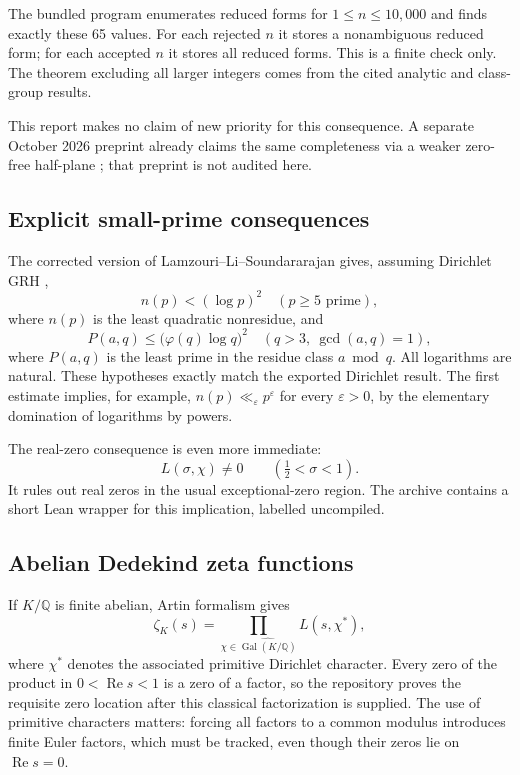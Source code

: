 \documentclass[11pt,letterpaper]{article}
\theoremstyle{definition}
\theoremstyle{remark}
\newcommand{\Q}{\mathbb Q}
\newcommand{\eps}{\varepsilon}
\newcommand{\Rea}{\operatorname{Re}}
\newcommand{\Gal}{\operatorname{Gal}}
\begin{document}
The bundled program enumerates reduced forms for \(1\le n\le10{,}000\)
and finds exactly these 65 values. For each rejected \(n\) it stores a
nonambiguous reduced form; for each accepted \(n\) it stores all reduced
forms. This is a finite check only. The theorem excluding all larger
integers comes from the cited analytic and class-group results.

This report makes no claim of new priority for this consequence. A
separate October 2026 preprint already claims the same completeness via
a weaker zero-free half-plane \cite{openai-quasi}; that preprint is not
audited here.

\subsection{Explicit small-prime consequences}

The corrected version of Lamzouri--Li--Soundararajan gives, assuming
Dirichlet GRH \cite[Corollaries 1.1 and 1.2]{lls},
\[
 n(p)<(\log p)^2\quad(p\ge5\text{ prime}),
\]
where \(n(p)\) is the least quadratic nonresidue, and
\[
 P(a,q)\le\bigl(\varphi(q)\log q\bigr)^2
 \quad(q>3,\ \gcd(a,q)=1),
\]
where \(P(a,q)\) is the least prime in the residue class \(a\bmod q\).
All logarithms are natural. These hypotheses exactly match the exported
Dirichlet result. The first estimate implies, for example,
\(n(p)\ll_\eps p^\eps\) for every \(\eps>0\), by the elementary domination
of logarithms by powers.

The real-zero consequence is even more immediate:
\[
 L(\sigma,\chi)\ne0\qquad(\tfrac12<\sigma<1).
\]
It rules out real zeros in the usual exceptional-zero region.
The archive contains a short Lean wrapper for this implication, labelled
uncompiled.

\subsection{Abelian Dedekind zeta functions}

If \(K/\Q\) is finite abelian, Artin formalism gives
\[
 \zeta_K(s)=\prod_{\chi\in\widehat{\Gal(K/\Q)}}L(s,\chi^*),
\]
where \(\chi^*\) denotes the associated primitive Dirichlet character.
Every zero of the product in \(0<\Rea s<1\) is a zero of a factor, so
the repository proves the requisite zero location after this classical
factorization is supplied. The use of primitive characters matters:
forcing all factors to a common modulus introduces finite Euler factors,
which must be tracked, even though their zeros lie on \(\Rea s=0\).
\end{document}
